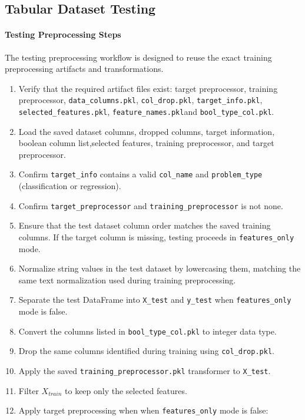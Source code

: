 \subsection{Tabular Dataset Testing}
\paragraph{Testing Preprocessing Steps}\par
The testing preprocessing workflow is designed to reuse the exact training preprocessing artifacts and transformations.

\begin{enumerate}
  \item Verify that the required artifact files exist:
        target preprocessor, training preprocessor,
        \texttt{data\_columns.pkl}, \texttt{col\_drop.pkl},
        \texttt{target\_info.pkl}, \texttt{selected\_features.pkl}, \texttt{feature\_names.pkl}and \texttt{bool\_type\_col.pkl}.
  \item Load the saved dataset columns, dropped columns, target information,
        boolean column list,selected features, training preprocessor, and target preprocessor.
  \item Confirm \texttt{target\_info} contains a valid \texttt{col\_name} and \texttt{problem\_type} (classification or regression).
  \item Confirm \texttt{target\_preprocessor} and \texttt{training\_preprocessor} is not none.
  \item Ensure that the test dataset column order matches the saved training columns. If the target column is missing, testing proceeds in \texttt{features\_only} mode.
  \item Normalize string values in the test dataset by lowercasing them, matching the same text normalization used during training preprocessing.
  \item Separate the test DataFrame into \texttt{X\_test} and \texttt{y\_test} when \texttt{features\_only} mode is false.
\item Convert the columns listed in \texttt{bool\_type\_col.pkl} to integer data type.  \item Drop the same columns identified during training using \texttt{col\_drop.pkl}.
  \item Apply the saved \texttt{training\_preprocessor.pkl} transformer to \texttt{X\_test}.
\item Filter $X_{train}$ to keep only the selected features.
  \item Apply target preprocessing when  when \texttt{features\_only} mode is false:

\end{enumerate}
